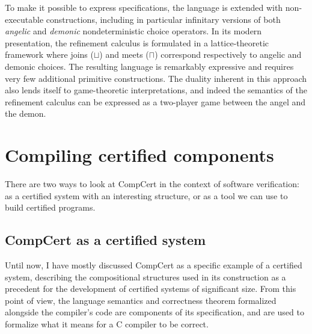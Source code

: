 \documentclass[11pt,oneside,draft]{book}
\theoremstyle{definition}
\begin{document}
To make it possible to express specifications,
the language is extended with non-executable constructions,
including in particular infinitary versions of both
\emph{angelic} and \emph{demonic} nondeterministic choice operators.
In its modern presentation,
the refinement calculus is formulated in a lattice-theoretic framework
where joins ($\sqcup$) and meets ($\sqcap$)
correspond respectively to angelic and demonic choices.
The resulting language is remarkably expressive
and requires very few additional primitive constructions.
The duality inherent in this approach
also lends itself to game-theoretic interpretations,
and indeed the semantics of the refinement calculus
can be expressed as a two-player game between
the angel and the demon.

%



\section{Compiling certified components} %

There are two ways to look at CompCert
in the context of software verification:
as a certified system
with an interesting structure,
or as a tool
we can use to build certified programs.

\subsection{CompCert as a certified system}

Until now,
I have mostly discussed
CompCert as a specific example of a certified system,
describing the compositional structures used in
its construction as a precedent for the development of
certified systems of significant size.
From this point of view,
the language semantics and correctness theorem
formalized alongside the compiler's code
are components of its specification,
and are used to formalize what it means
for a C compiler to be correct.
\end{document}
